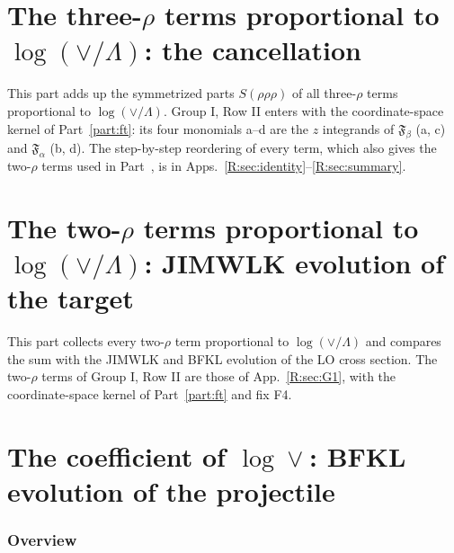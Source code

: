\documentclass[10pt]{article}
\numberwithin{equation}{section}
\begin{document}

\part{The three-\texorpdfstring{$\rho$}{rho} terms proportional to \texorpdfstring{$\log(\vee/\Lambda)$}{log(vee/Lambda)}: the cancellation}\label{part:three}
This part adds up the symmetrized parts $S(\rho\rho\rho)$ of all three-$\rho$ terms proportional to $\log(\vee/\Lambda)$. Group I, Row II enters with the coordinate-space kernel of Part~\ref{part:ft}: its four monomials a--d are the $z$ integrands of $\mathfrak F_\beta$ (a, c) and $\mathfrak F_\alpha$ (b, d). The step-by-step reordering of every term, which also gives the two-$\rho$ terms used in Part~\ref{part:jimwlk}, is in Apps.~\ref{R:sec:identity}--\ref{R:sec:summary}.


\part{The two-\texorpdfstring{$\rho$}{rho} terms proportional to \texorpdfstring{$\log(\vee/\Lambda)$}{log(vee/Lambda)}: JIMWLK evolution of the target}\label{part:jimwlk}
This part collects every two-$\rho$ term proportional to $\log(\vee/\Lambda)$ and compares the sum with the JIMWLK and BFKL evolution of the LO cross section. The two-$\rho$ terms of Group I, Row II are those of App.~\ref{R:sec:G1}, with the coordinate-space kernel of Part~\ref{part:ft} and fix F4.


\part{The coefficient of \texorpdfstring{$\log\vee$}{log vee}: BFKL evolution of the projectile}\label{part:bfkl}
\section{Overview}\label{sec:bfkl-overview}
\end{document}
